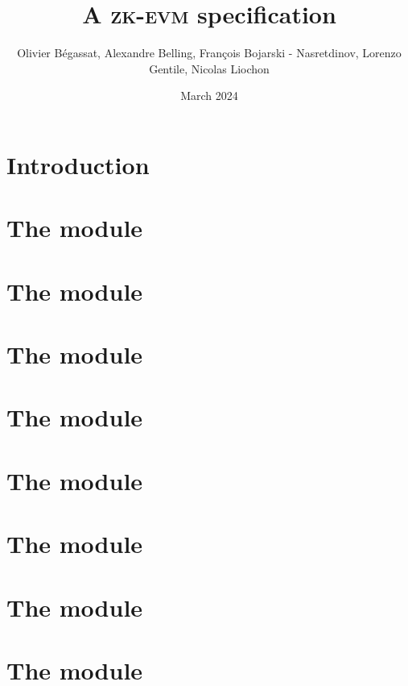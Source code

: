 \documentclass[fleqn]{report}
\title{A \textsc{zk-evm} specification}
\author{%
Olivier Bégassat,
Alexandre Belling,
François Bojarski - Nasretdinov,
Lorenzo Gentile,
Nicolas Liochon
}
\date{March 2024}
\begin{document}
\maketitle
\setcounter{tocdepth}{0}
\dominitoc
\tableofcontents

\setcounter{tocdepth}{4}

\chapter*{Introduction}                              \label{chap: spec intro}      \minitoc    
\chapter{The \hubMod{} module}                       \label{chap: hub}             \minitoc    
\chapter{The \mmuMod{} module}                       \label{chap: mmu}             \minitoc    
\chapter{The \mmioMod{} module}                      \label{chap: ram}             \minitoc    
\chapter{The \romMod{} module}                       \label{chap: rom}             \minitoc    
\chapter{The \romLexMod{} module}                    \label{chap: rom lex}         \minitoc    
\chapter{The \oobMod{} module}                       \label{chap: oob}             \minitoc    
\chapter{The \mxpMod{} module}                       \label{chap: mxp}             \minitoc    
\chapter{The \stpMod{} module}                       \label{chap: stp}             \minitoc    
\end{document}
